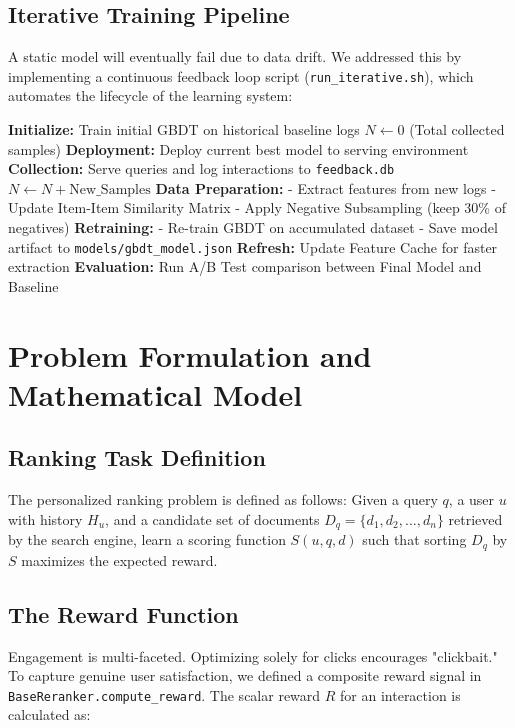 \documentclass[11pt,a4paper]{article}
\begin{document}
\subsection{Iterative Training Pipeline}
A static model will eventually fail due to data drift. We addressed this by implementing a continuous feedback loop script (\texttt{run\_iterative.sh}), which automates the lifecycle of the learning system:

\begin{algorithm}
\caption{Iterative Online/Offline Learning Loop}
\begin{algorithmic}[1]
\State \textbf{Initialize:} Train initial GBDT on historical baseline logs
\State $N \leftarrow 0$ (Total collected samples)
    \State \textbf{Deployment:} Deploy current best model to serving environment
    \State \textbf{Collection:} Serve queries and log interactions to \texttt{feedback.db}
    \State $N \leftarrow N + \text{New\_Samples}$
    \State \textbf{Data Preparation:}
        \State \quad - Extract features from new logs
        \State \quad - Update Item-Item Similarity Matrix
        \State \quad - Apply Negative Subsampling (keep 30\% of negatives)
    \State \textbf{Retraining:}
        \State \quad - Re-train GBDT on accumulated dataset
        \State \quad - Save model artifact to \texttt{models/gbdt\_model.json}
    \State \textbf{Refresh:} Update Feature Cache for faster extraction
\EndWhile
\State \textbf{Evaluation:} Run A/B Test comparison between Final Model and Baseline
\end{algorithmic}
\end{algorithm}

\section{Problem Formulation and Mathematical Model}

\subsection{Ranking Task Definition}
The personalized ranking problem is defined as follows:
Given a query $q$, a user $u$ with history $H_u$, and a candidate set of documents $D_q = \{d_1, d_2, ..., d_n\}$ retrieved by the search engine, learn a scoring function $S(u, q, d)$ such that sorting $D_q$ by $S$ maximizes the expected reward.

\subsection{The Reward Function}
Engagement is multi-faceted. Optimizing solely for clicks encourages "clickbait." To capture genuine user satisfaction, we defined a composite reward signal in \texttt{BaseReranker.compute\_reward}. The scalar reward $R$ for an interaction is calculated as:
\end{document}
